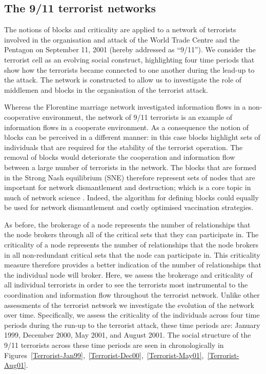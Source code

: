 \subsection{The 9/11 terrorist networks}

The notions of blocks and criticality are applied to a network of terrorists involved in the organisation and attack of the World Trade Centre and the Pentagon on September 11, 2001 (hereby addressed as ``9/11''). We consider the terrorist cell as an evolving social construct, highlighting four time periods that show how the terrorists became connected to one another during the lead-up to the attack. The network is constructed to allow us to investigate the role of middlemen and blocks in the organisation of the terrorist attack.

Whereas the Florentine marriage network investigated information flows in a non-cooperative environment, the network of 9/11 terrorists is an example of information flows in a cooperate environment. As a consequence the notion of blocks can be perceived in a different manner: in this case blocks highlight sets of individuals that are required for the stability of the terrorist operation. The removal of blocks would deteriorate the cooperation and information flow between a large number of terrorists in the network. The blocks that are formed in the Strong Nash equilibrium (SNE) therefore represent sets of nodes that are important for network dismantlement and destruction; which is a core topic in much of network science \citep{Carley2002, Carley2006, KovacsBarabasi2015, MoroneMaske2015}. Indeed, the algorithm for defining blocks could equally be used for network dismantlement and costly optimised vaccination strategies.

As before, the brokerage of a node represents the number of relationships that the node brokers through all of the critical sets that they can participate in. The criticality of a node represents the number of relationships that the node brokers in all non-redundant critical sets that the node can participate in. This criticality measure therefore provides a better indication of the number of relationships that the individual node will broker. Here, we assess the brokerage and criticality of all individual terrorists in order to see the terrorists most instrumental to the coordination and information flow throughout the terrorist network. Unlike other assessments of the terrorist network \citep{Krebs2002, Farley2003, Lindelauf2013, Flores2014} we investigate the evolution of the network over time. Specifically, we assess the criticality of the individuals across four time periods during the run-up to the terrorist attack, these time periods are: January 1999, December 2000, May 2001, and August 2001. The social structure of the 9/11 terrorists across these time periods are seen in chronologically in Figures~\ref{Terrorist-Jan99},~\ref{Terrorist-Dec00},~\ref{Terrorist-May01},~\ref{Terrorist-Aug01}.


